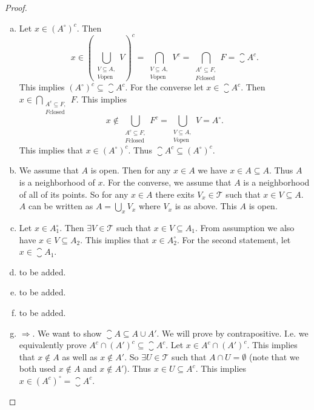 \begin{proof}
\begin{enumerate}[(a)]
		\item Let $ x \in (A^\circ)^c $. Then 
		\[ x \in (\bigcup_{\substack{V \subseteq A,\\ V\text{open}}} V)^c = \bigcap_{\substack{V \subseteq A,\\ V\text{open}}} V^c = \bigcap_{\substack{A^c \subseteq F,\\ F\text{closed}}} F = \closure{A^c}. \]
		This implies $ (A^\circ)^c \subseteq \closure{A^c} $. For the converse let $ x \in \closure{A^c} $. Then $ x \in \bigcap_{\substack{A^c \subseteq F,\\ F\text{closed}}} F $. This implies
		\[ x \notin \bigcup_{\substack{A^c \subseteq F,\\ F\text{closed}}} F^c = \bigcup_{\substack{V\subseteq A,\\ V\text{open}}} V = A^\circ . \]
		This implies that $ x \in (A^\circ)^c $. Thus $ \closure{A^c} \subseteq (A^\circ)^c $.
		
		\item We assume that $ A $ is open. Then for any $ x \in A $ we have $ x \in A \subseteq A $. Thus $ A $ is a neighborhood of $ x $. For the converse, we assume that $ A $ is a neighborhood of all of its points. So for any $ x \in A $ there exits $ V_x \in \mathcal{T} $ such that $ x \in V \subseteq A $. $ A $ can be written as $ A = \bigcup_x V_x $ where $ V_x $ is as above. This $ A $ is open.
		
		\item Let $ x \in A_1^\circ $. Then $ \exists V \in \mathcal{T} $ such that $ x \in V \subseteq A_1 $. From assumption we also have $ x \in V \subseteq A_2 $. This implies that $ x \in A_2^\circ $. For the second statement, let $ x \in \closure{A_1} $.
		
		
		\item {\color{red} \noindent to be added.}
		
		\item {\color{red} \noindent to be added.}
		
		\item {\color{red} \noindent to be added.}
		
		\item \noindent $ \boxed{\Rightarrow} $. We want to show $ \closure{A} \subseteq A \cup A' $. We will prove by contrapositive. I.e. we equivalently prove $ A^c \cap (A')^c \subseteq \closure{A}^c $. Let $ x \in A^c \cap (A')^c $. This implies that $ x \notin A $ as well as $ x \notin A' $. So $ \exists U \in \mathcal{T} $ such that $ A\cap U = \emptyset $ (note that we both used $ x\notin A $ and $ x\notin A' $). Thus $ x\in U \subseteq A^c $. This implies $ x \in (A^c)^\circ = \closure{A}^c $.
		

\end{enumerate}
\end{proof}
